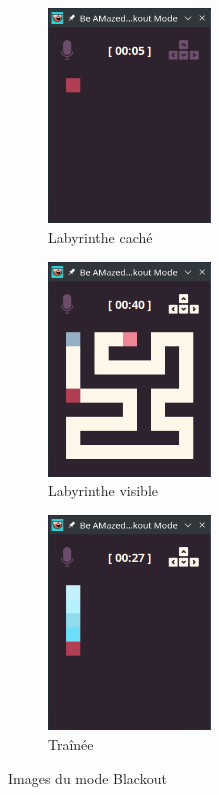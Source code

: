 \begin{figure}[!htb]%
    \centering
    \begin{subfigure}{4.3cm}
        \includegraphics[width=4.3cm]{ressources/Implementation/Labyrinthe/Vue/Blackout/BlackoutDark.png}%
        \caption{Labyrinthe caché}
        \label{fig:HiddenLabyrinth}
    \end{subfigure}
    \qquad
    \begin{subfigure}{4.3cm}
        \includegraphics[width=4.3cm]{ressources/Implementation/Labyrinthe/Vue/Blackout/BlackoutLight.png}%
        \caption{Labyrinthe visible}
        \label{fig:VisibleLabyrinth}
    \end{subfigure}
    \qquad
    \begin{subfigure}{4.3cm}
        \includegraphics[width=4.3cm]{ressources/Implementation/Labyrinthe/Vue/Blackout/BlackoutDarkParticles.png}%
        \caption{Traînée}
        \label{fig:HiddenLabyrinthWithParticles}
    \end{subfigure}
    \caption{Images du mode Blackout}%
    \label{fig:BlackoutModeLabyrinth}
\end{figure}
\FloatBarrier

